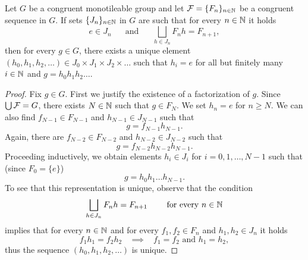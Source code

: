 \begin{lem}\label{lem:factorization}
Let $G$ be a congruent monotileable group and let  $\operatorname{\mathcal{F}}=\{F_n\}_{n\in\mathbb{N}}$ be a congruent \Folner sequence in $G$. If sets $\{J_n\}_{n\in\mathbb{N}}$ in $G$ are such that for every $n\in\mathbb{N}$ it holds 
\[
 e\in J_n~~~~~~\text{ and }~~~~~~\bigsqcup_{h\in J_n}F_nh=F_{n+1},
\]   
then for every $g\in G$, there exists a unique element
$
(h_0,h_1,h_2,\ldots)\in J_0\times J_1\times J_2\times\ldots
$
such that $h_i=e$ for all but finitely many $i\in\mathbb{N}$ and 
$
g=h_0h_1h_2\ldots.
$
\end{lem}

\begin{proof}
Fix $g\in G$. First we justify the existence of a factorization of $g$. 
Since $\bigcup\operatorname{\mathcal{F}}=G$, there exists $N\in\mathbb{N}$ such that $g\in F_N$. 
%
We set $h_n=e$ for $n\geq N$.
%
We can also find $f_{N-1}\in F_{N-1}$ and $h_{N-1}\in J_{N-1}$ such that 
\[
g=f_{N-1}h_{N-1}.
\]
Again, there are $f_{N-2}\in F_{N-2}$ and $h_{N-2}\in J_{N-2}$ such that 
\[
g=f_{N-2}h_{N-2}h_{N-1}.
\]
Proceeding inductively, we obtain elements $h_i\in J_i$ for $i=0,1,\ldots,N-1$ such that (since $F_0=\{e\}$)
\[
g=h_0h_1\ldots h_{N-1}.
\]
To see that this representation is unique, observe that the condition 
\[
\bigsqcup_{h\in J_n}F_nh=F_{n+1} ~~~~~~\text{ for every } n\in\mathbb{N}
\]
implies that for every $n\in\mathbb{N}$  and for every $f_1,f_2\in F_n$ and $h_1,h_2\in J_n$ it holds 
\[
f_1h_1 = f_2h_2~~~~\implies ~~~~ f_1=f_2 \mbox{ and } h_1=h_2,
\]
thus the sequence $(h_0, h_1,h_2,\ldots)$ is unique.
\end{proof}


